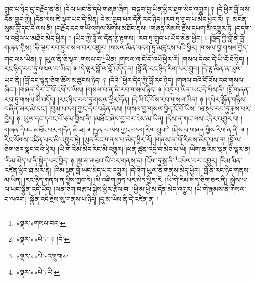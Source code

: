 གྲུབ་པ་ཉིད་དུ་བརྗོད་ན་ནི། །དེ་ལ་ཡང་ནི་དཔེ་གཞན་ཞིག །བསྒྲུབ་བྱ་ཡིན་ཕྱིར་ཐུག་མེད་འགྱུར། ༈ །དེ་ཕྱིར་བློ་ལས་དོན་གྲུབ་ཀྱི། །དོན་ལས་ཇི་ལྟར་ཡང་དེ་མིན། དེ་མ་གྲུབ་པར་དོན་རང་ཉིད། །རབ་ཏུ་གྲུབ་པ་མེད་ཕྱིར་རོ། ༈ །མངོན་སུམ་བློ་དང་དེ་ལས་ནི། །བརྗོད་དང་གཡོ་འགུལ་སོགས་མཐོང་ནས། །གཞན་སེམས་རྗེས་དཔག་མི་འགྱུར་ཏེ། །བདག་ལ་འབྲེལ་པ་མཐོང་མེད་ཕྱིར། ༈ །ཡིད་ཀྱི་བློ་ལ་དོན་གྱི་རྟགས། །རབ་ཏུ་གྲུབ་པ་ཡོད་མིན་ཕྱིར། ༈ །ཁྱོད་ཀྱི་བློ་ནི་བློ་གཞན་གྱིས། །ཅི་ལྟར་རབ་ཏུ་གསལ་བར་འགྱུར། །གསལ་མིན་བདག་ཏུ་མཚུངས་པའི་ཕྱིར། །གསལ་བྱ་གསལ་བྱེད་གང་ལས་ཡིན། ༈ །ཡུལ་ནི་ཅི་ལྟར་:གསལ་བ་\footnote{«སྣར་»གསལ་བར་}ཡིན། །གསལ་ལ་ངོ་བོ་འཕོ་ཕྱིར་རོ། །གསལ་དེའང་དེ་ཡི་ངོ་བོ་ཉིད། །རང་ཉིད་རབ་ཏུ་གསལ་བ་ཡིན། ༈ །དེ་ལྟར་བློ་ལ་བློ་འདོད་ན། །བློ་ནི་རང་ཉིད་རིག་པར་གྲུབ། །དེ་ལྟ་མིན་ན་ཡུལ་ཡང་ནི། །བློ་དང་ལྷན་ཅིག་ཆོས་མཚུངས་ཉིད། ༈ །དེའི་\footnote{«སྣར་»«པེ་»། ༈ །དེ་}ཕྱིར་དེད་ཀྱི་བློ་རང་ཉིད། །གསལ་བའི་ངོ་བོས་རབ་གསལ་ཞིང་། །གཞན་དེར་ངོ་བོ་འཕོ་བ་ཡིས། །གསལ་བ་ན་ནི་རབ་གསལ་ཉིད། ༈ །འདྲ་བ་ཡིན་ཡང་དེ་ཡིས་ནི། །བློ་གཞན་རབ་ཏུ་གསལ་མི་འདོད། །རང་ཉིད་རབ་ཏུ་གསལ་ཕྱིར་དོན། །དེ་ཡི་ངོ་བོས་རབ་གསལ་ཡིན། ༈ །དཔེར་སྒྲོན་གཉིས་བཞིན་མར་མེ་དང་། །བུམ་པ་དག་ཀྱང་དེར་བརྟེན་ནས། །གསལ་བྱ་གསལ་བྱེད་ངོ་བོ་ཡིས། །ཐ་སྙད་རབ་ཏུ་རྒྱས་པར་བྱེད། ༈ །ཡུལ་དང་དབང་པོ་ཙམ་གྱིས་ནི། །མཐོང་ཞེས་བྱ་བར་ངེས་མ་ཡིན། །དེས་ན་གང་ལས་འདིར་འགྱུར་བ། །གཞན་དེའང་མཐོང་བར་གདོན་མི་ཟ། ༈ །དྲན་པ་ལས་ཀྱང་བདག་རིག་གྲུབ།\footnote{«སྣར་»«པེ་»འགྲུབ།} །ཤེས་པ་གཞན་གྱིས་རིག་ན་ནི། ༈ །རིང་སོགས་འཛིན་པར་མི་འགྱུར་ཏེ། །ཡུན་རིང་གནས་པ་མེད་ཕྱིར་རོ། །གནས་ན་གོ་རིམས་མེད་པས་ན། །བློ་ལ་ཅིག་ཅར་སྣང་བའི་ཕྱིར། །ཡི་གེ་རིམ་མེད་རིང་མི་འགྱུར། །ཕན་ཚུན་འདྲེ་བ་མེད་པ་ཡི། །ཡིག་ཆ་རིམ་ལྡན་ཅི་ལྟར་ན། །རིམ་མེད་པ་ནི་སྐྱེད་པར་བྱེད། ༈ །སྔ་མ་མཐའ་ཡི་བར་གནས་ན། །འོག་ཏུ་སྒྲ་ནི་\footnote{«སྣར་»«པེ་»ཡི་}འཕེལ་བར་འགྱུར། །རིམ་མིན་འཛིན་ཕྱིར་ཐ་མར་ནི། །རིམ་ལྡན་བློ་ཡང་མེད་པར་འགྱུར། །དེ་འོག་ཡུལ་ནི་གནས་མེད་ཕྱིར། །བློ་ནི་རང་ཉིད་གནས་མ་ཡིན། །རང་ཉིད་གནས་ན་ཕྱིས་ཀྱང་དེ། །མི་འཇིག་ཁྱད་པར་མེད་ཕྱིར་རོ། །ཡི་གེ་རིམ་མེད་ཅིག་ཅར་ནི། །སྐྱེས་པ་ལ་ཡང་སྐྱོན་འདི་ཡོད། །ལན་ཅིག་བརྩལ་སྐྱེས་ཕྱིར་རྩོལ་བ། །ཕྱི་མ་ཕྱི་མ་དོན་མེད་འགྱུར། །ཡི་གེ་རྣམས་ནི་གསལ་བ་ལའང་། །སྐྱོན་འདི་རྗེས་སུ་གནས་པ་ཉིད། །དུ་མ་ཡིས་ནི་དེ་འཛིན་ན། །
